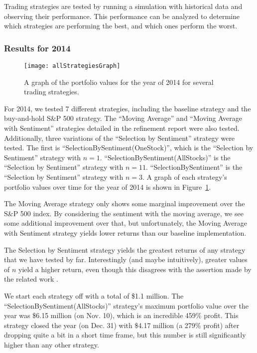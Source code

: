 Trading strategies are tested by running a simulation with historical data and observing their performance.
This performance can be analyzed to determine which strategies are performing the best, and which ones perform the worst.

\subsubsection{Results for 2014}

\begin{figure}[h]
  \begin{center}
    \texttt{[image: allStrategiesGraph]}
  \end{center}
  \caption{A graph of the portfolio values for the year of 2014 for several trading strategies.}\label{fig:allStrategiesGraph}
\end{figure}

For 2014, we tested 7 different strategies, including the baseline strategy and the buy-and-hold S\&P 500 strategy.
The ``Moving Average'' and ``Moving Average with Sentiment'' strategies detailed in the refinement report were also tested.
Additionally, three variations of the ``Selection by Sentiment'' strategy were tested.
The first is ``SelectionBySentiment(OneStock)'', which is the ``Selection by Sentiment'' strategy with $n=1$.
``SelectionBySentiment(AllStocks)'' is the ``Selection by Sentiment'' strategy with $n=11$.
``SelectionBySentiment'' is the ``Selection by Sentiment'' strategy with $n=3$.
A graph of each strategy's portfolio values over time for the year of 2014 is shown in Figure~\ref{fig:allStrategiesGraph}.

The Moving Average strategy only shows some marginal improvement over the S\&P 500 index.
By considering the sentiment with the moving average, we see some additional improvement over that, but unfortunately, the Moving Average with Sentiment strategy yields lower returns than our baseline implementation.

The Selection by Sentiment strategy yields the greatest returns of any strategy that we have tested by far.
Interestingly (and maybe intuitively), greater values of $n$ yield a higher return, even though this disagrees with the assertion made by the related work \cite{tradingSentimentPaper}.

We start each strategy off with a total of \$1.1 million.
The ``SelectionBySentiment(AllStocks)'' strategy’s maximum portfolio value over the year was \$6.15 million (on Nov. 10), which is an incredible 459\% profit.
This strategy closed the year (on Dec. 31) with \$4.17 million (a 279\% profit) after dropping quite a bit in a short time frame, but this number is still significantly higher than any other strategy.

